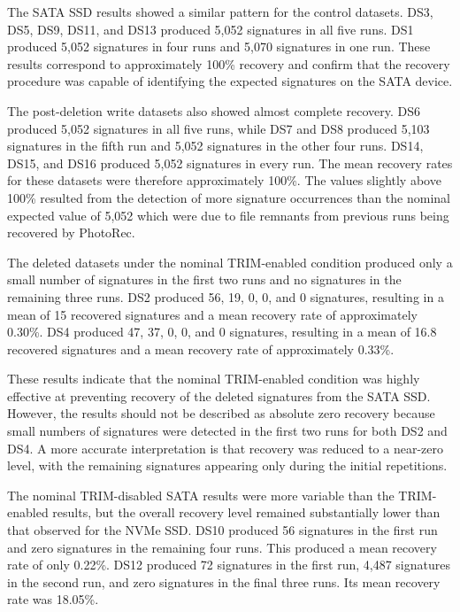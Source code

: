 The SATA SSD results showed a similar pattern for the control datasets. DS3, DS5, DS9, DS11, and DS13 produced 5,052 signatures in all five runs. DS1 produced 5,052 
signatures in four runs and 5,070 signatures in one run. These results correspond to approximately 100\% recovery and confirm that the recovery procedure was capable of 
identifying the expected signatures on the SATA device. 

The post-deletion write datasets also showed almost complete recovery. DS6 produced 5,052 signatures in all five runs, while DS7 and DS8 produced 5,103 signatures in 
the fifth run and 5,052 signatures in the other four runs. DS14, DS15, and DS16 produced 5,052 signatures in every run. The mean recovery rates for these datasets were 
therefore approximately 100\%. The values slightly above 100\% resulted from the detection of more signature occurrences than the nominal expected value of 5,052 which 
were due to file remnants from previous runs being recovered by PhotoRec. 

The deleted datasets under the nominal TRIM-enabled condition produced only a small number of signatures in the first two runs and no signatures in the remaining three 
runs. DS2 produced 56, 19, 0, 0, and 0 signatures, resulting in a mean of 15 recovered signatures and a mean recovery rate of approximately 0.30\%. DS4 produced 47, 37, 
0, 0, and 0 signatures, resulting in a mean of 16.8 recovered signatures and a mean recovery rate of approximately 0.33\%. 

These results indicate that the nominal TRIM-enabled condition was highly effective at preventing recovery of the deleted signatures from the SATA SSD. However, the 
results should not be described as absolute zero recovery because small numbers of signatures were detected in the first two runs for both DS2 and DS4. A more accurate 
interpretation is that recovery was reduced to a near-zero level, with the remaining signatures appearing only during the initial repetitions.

The nominal TRIM-disabled SATA results were more variable than the TRIM-enabled results, but the overall recovery level remained substantially lower than that observed 
for the NVMe SSD. DS10 produced 56 signatures in the first run and zero signatures in the remaining four runs. This produced a mean recovery rate of only 0.22\%. DS12 
produced 72 signatures in the first run, 4,487 signatures in the second run, and zero signatures in the final three runs. Its mean recovery rate was 18.05\%. 

